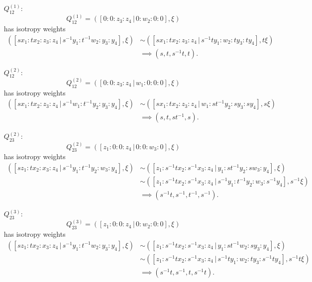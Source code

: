 \documentclass{article}
\begin{document}
	\begin{itemize}
		\item[$Q_{12}^{(1)}$:]
		\[
			Q_{12}^{(1)} = \left( [ 0 : 0 : z_{3} : z_{4} \, | \, 0 : w_{2} : 0 : 0 ], \xi \right)
		\]
		has isotropy weights
		\begin{align*}
			\left( [sx_{1} : tx_{2} : z_{3} : z_{4} \, | \, s^{-1}y_{1} : t^{-1}w_{2} : y_{3} : y_{4}], \xi \right) &\sim \left( [sx_{1} : tx_{2} : z_{3} : z_{4} \, | \, s^{-1}ty_{1} : w_{2} : ty_{3} : ty_{4}], t\xi \right) \\ &\implies (s, t, s^{-1}t, t).
		\end{align*}
	
		\item[$Q_{12}^{(2)}$:]
		\[
			Q_{12}^{(2)} = \left( [ 0 : 0 : z_{3} : z_{4} \, | \, w_{1} : 0 : 0 : 0 ], \xi \right)
		\]
		has isotropy weights
		\begin{align*}
			\left( [sx_{1} : tx_{2} : z_{3} : z_{4} \, | \, s^{-1}w_{1} : t^{-1}y_{2} : y_{3} : y_{4}], \xi \right) &\sim \left( [sx_{1} : tx_{2} : z_{3} : z_{4} \, | \, w_{1} : st^{-1}y_{2} : sy_{3} : sy_{4}], s\xi \right) \\ &\implies (s, t, st^{-1}, s).
		\end{align*}
	
		\item[$Q_{23}^{(2)}$:]
		\[
		Q_{23}^{(2)} = \left( [ z_{1} : 0 : 0 : z_{4} \, | \, 0 : 0 : w_{3} : 0 ], \xi \right)
		\]
		has isotropy weights
		\begin{align*}
			\left( [sz_{1} : tx_{2} : x_{3} : z_{4} \, | \, s^{-1}y_{1} : t^{-1}y_{2} : w_{3} : y_{4}], \xi \right) &\sim \left( [z_{1} : s^{-1}tx_{2} : s^{-1}x_{3} : z_{4} \, | \, y_{1} : st^{-1}y_{2} : sw_{3} : y_{4} ], \xi \right) \\ &\sim \left( [z_{1} : s^{-1}tx_{2} : s^{-1}x_{3} : z_{4} \, | \, s^{-1}y_{1} : t^{-1}y_{2} : w_{3} : s^{-1}y_{4} ], s^{-1}\xi \right) \\ &\implies (s^{-1}t, s^{-1}, t^{-1}, s^{-1}).
		\end{align*}
	
		\item[$Q_{23}^{(3)}$:]
		\[
		Q_{23}^{(3)} = \left( [ z_{1} : 0 : 0 : z_{4} \, | \, 0 : w_{2} : 0 : 0 ], \xi \right)
		\]
		has isotropy weights
		\begin{align*}
			\left( [sz_{1} : tx_{2} : x_{3} : z_{4} \, | \, s^{-1}y_{1} : t^{-1}w_{2} : y_{3} : y_{4}], \xi \right) &\sim \left( [z_{1} : s^{-1}tx_{2} : s^{-1}x_{3} : z_{4} \, | \, y_{1} : st^{-1}w_{2} : sy_{3} : y_{4}], \xi \right) \\ &\sim \left( [z_{1} : s^{-1}tx_{2} : s^{-1}x_{3} : z_{4} \, | \, s^{-1}ty_{1} : w_{2} : ty_{3} : s^{-1}ty_{4}], s^{-1}t \xi \right) \\ &\implies (s^{-1}t, s^{-1}, t, s^{-1}t).
		\end{align*}
	

\end{itemize}
\end{document}
